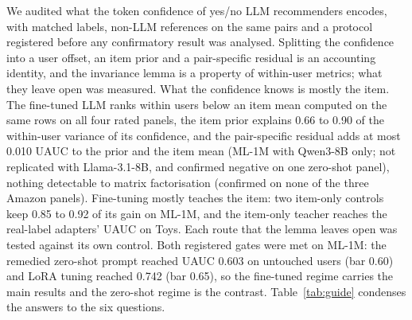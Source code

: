 We audited what the token confidence of yes/no LLM recommenders encodes, with matched labels, non-LLM references on the same pairs
and a protocol registered before any confirmatory result was analysed. Splitting the confidence into a user offset, an item prior
and a pair-specific residual is an accounting identity, and the invariance lemma is a property of within-user metrics; what they
leave open was measured.
What the confidence knows is mostly the item. The fine-tuned LLM ranks within users below an item mean computed on the same rows on
all four rated panels, the item prior explains 0.66 to 0.90 of the within-user variance of its confidence, and the pair-specific
residual adds at most 0.010 UAUC to the prior and the item mean (ML-1M with Qwen3-8B only; not replicated with Llama-3.1-8B, and
confirmed negative on one zero-shot panel), nothing detectable to matrix factorisation (confirmed on none of the three Amazon
panels). Fine-tuning mostly teaches the item: two item-only controls keep 0.85 to 0.92 of its gain on ML-1M, and the item-only teacher
reaches the real-label adapters' UAUC on Toys. Each route that the lemma leaves open was tested against its own control.
Both registered gates were met on ML-1M: the remedied zero-shot prompt reached UAUC 0.603 on untouched users
(bar 0.60) and LoRA tuning reached 0.742 (bar 0.65), so the fine-tuned regime carries the
main results and the zero-shot regime is the contrast. Table~\ref{tab:guide} condenses the answers to the six questions.

